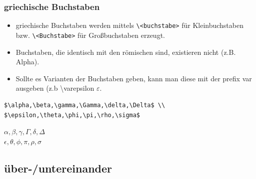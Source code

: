 \begin{frame}[fragile]
\frametitle{griechische Buchstaben}
\begin{itemize}[<+->]
  \item griechische Buchstaben werden mittels \lstinline[style=Latex]+\<buchstabe>+ für Kleinbuchstaben bzw. \lstinline[style=Latex]+\<Buchstabe>+ für Großbuchstaben erzeugt.
  \item Buchstaben, die identisch mit den römischen sind, existieren nicht (z.B. Alpha).
  \item Sollte es Varianten der Buchstaben geben, kann man diese mit der prefix var ausgeben (z.b \textbackslash{}varepsilon $\varepsilon$.
\end{itemize}
\pause
\begin{lstlisting}[style=Latex]
$\alpha,\beta,\gamma,\Gamma,\delta,\Delta$ \\
$\epsilon,\theta,\phi,\pi,\rho,\sigma$
\end{lstlisting}
\pause
$\alpha,\beta,\gamma,\Gamma,\delta,\Delta$ \\
$\epsilon,\theta,\phi,\pi,\rho,\sigma$
\end{frame}


\subsection{über-/untereinander}

